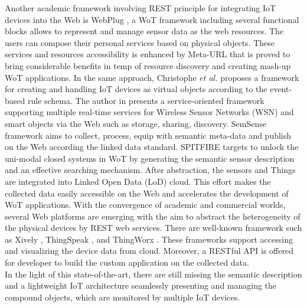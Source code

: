 Another academic framework involving REST principle for integrating IoT devices into the Web is WebPlug \cite{ostermaier2010webplug}, a WoT framework including several functional blocks allows to represent and manage sensor data as the web resources. The users can compose their personal services based on physical objects. These services and resources accessibility is enhanced by Meta-URL that is proved to bring considerable benefits in temp of resource discovery and creating mash-up WoT applications. In the same approach, Christophe \textit{et al.} \cite{christophe2011web} proposes a framework for creating and handling IoT devices as virtual objects according to the event-based rule schema. The author in \cite{orestis2012towards} presents a service-oriented framework supporting multiple real-time services for  Wireless Sensor Networks (WSN) and smart objects via the Web such as storage, sharing, discovery. SemSense framework \cite{moraru2011exposing} aims to collect, process, equip with semantic meta-data and publish on the Web according the linked data standard. SPITFIRE \cite{pfisterer2011spitfire} targets to unlock the uni-modal closed systems in WoT by generating the semantic sensor description and an effective searching mechanism. After abstraction, the sensors and Things are integrated into Linked Open Data (LoD) cloud. This effort makes the collected data easily accessible on the Web and accelerates the development of WoT applications. With the convergence of academic and commercial worlds, several Web platforms are emerging with the aim to abstract the heterogeneity of the physical devices by REST web services. There are well-known framework such as Xively \cite{Doe:2009:Online}, ThingSpeak \cite{thinkspeak:Online}, and ThingWorx \cite{thingworx:Online}. These frameworks support accessing and visualizing the device data from cloud. Moreover, a RESTful API is offered for developer to build the custom application on the collected data.\\

In the light of this state-of-the-art, there are still missing the semantic description and a lightweight IoT architecture seamlessly presenting and managing the compound objects, which are monitored by multiple IoT devices.

